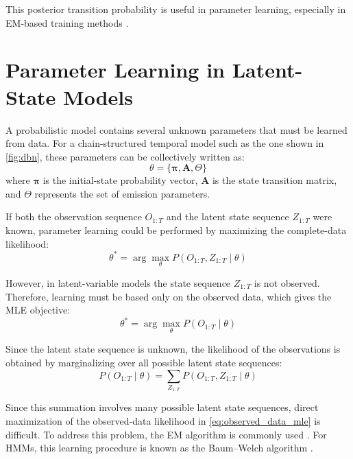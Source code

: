 This posterior transition probability is useful in parameter learning, especially in \ac{EM}-based training methods \cite{rabiner1989tutorial}.



\section{Parameter Learning in Latent-State Models}
\label{sec:parameter_learning}
A probabilistic model contains several unknown parameters that must be learned from data. For a chain-structured temporal model such as the one shown in \autoref{fig:dbn}, 
these parameters can be collectively written as:
\[
\theta = \{\bm{\pi}, \bm{A}, \Theta\}
\]
where $\bm{\pi}$ is the initial-state probability vector, $\bm{A}$ is the state transition matrix, and $\Theta$ represents the set of emission parameters.

\par If both the observation sequence $O_{1:T}$ and the latent state sequence $Z_{1:T}$ were known, parameter learning could be performed by maximizing the complete-data likelihood:
\begin{equation}
\theta^* = \arg\max_{\theta} P(O_{1:T}, Z_{1:T} \mid \theta)
\label{eq:complete_data_mle}
\end{equation}

However, in latent-variable models the state sequence $Z_{1:T}$ is not observed. Therefore, learning must be based only on the observed data, which gives the \ac{MLE} objective:
\begin{equation}
\theta^{*} = \arg\max_{\theta} P(O_{1:T} \mid \theta)
\label{eq:observed_data_mle}
\end{equation}

\par Since the latent state sequence is unknown, the likelihood of the observations is obtained by marginalizing over all possible latent state sequences:
\begin{equation}
P(O_{1:T} \mid \theta) = \sum_{Z_{1:T}} P(O_{1:T}, Z_{1:T} \mid \theta)
\label{eq:observed_likelihood_marginalized}
\end{equation}

\par Since this summation involves many possible latent state sequences, direct maximization of the observed-data likelihood in \eqref{eq:observed_data_mle} is difficult. 
To address this problem, the \ac{EM} algorithm is commonly used \cite{Murphy2012MachineL}. 
For \acp{HMM}, this learning procedure is known as the Baum–Welch algorithm \cite{rabiner1989tutorial}.




